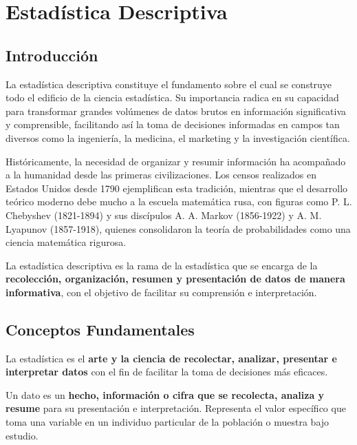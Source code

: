 \chapter{Estadística Descriptiva}\label{ch:estdescr}

\section{Introducción}

La estadística descriptiva constituye el fundamento sobre el cual se construye todo el edificio de la ciencia estadística. Su importancia radica en su capacidad para transformar grandes volúmenes de datos brutos en información significativa y comprensible, facilitando así la toma de decisiones informadas en campos tan diversos como la ingeniería, la medicina, el marketing y la investigación científica.

Históricamente, la necesidad de organizar y resumir información ha acompañado a la humanidad desde las primeras civilizaciones. Los censos realizados en Estados Unidos desde 1790 ejemplifican esta tradición, mientras que el desarrollo teórico moderno debe mucho a la escuela matemática rusa, con figuras como P. L. Chebyshev (1821-1894) y sus discípulos A. A. Markov (1856-1922) y A. M. Lyapunov (1857-1918), quienes consolidaron la teoría de probabilidades como una ciencia matemática rigurosa.

\begin{definition}
La estadística descriptiva es la rama de la estadística que se encarga de la \textbf{recolección, organización, resumen y presentación de datos de manera informativa}, con el objetivo de facilitar su comprensión e interpretación.
\end{definition}

\section{Conceptos Fundamentales}

\begin{definition}[Estadística]
La estadística es el \textbf{arte y la ciencia de recolectar, analizar, presentar e interpretar datos} con el fin de facilitar la toma de decisiones más eficaces.
\end{definition}

\begin{definition}[Dato]
Un dato es un \textbf{hecho, información o cifra que se recolecta, analiza y resume} para su presentación e interpretación. Representa el valor específico que toma una variable en un individuo particular de la población o muestra bajo estudio.
\end{definition}

